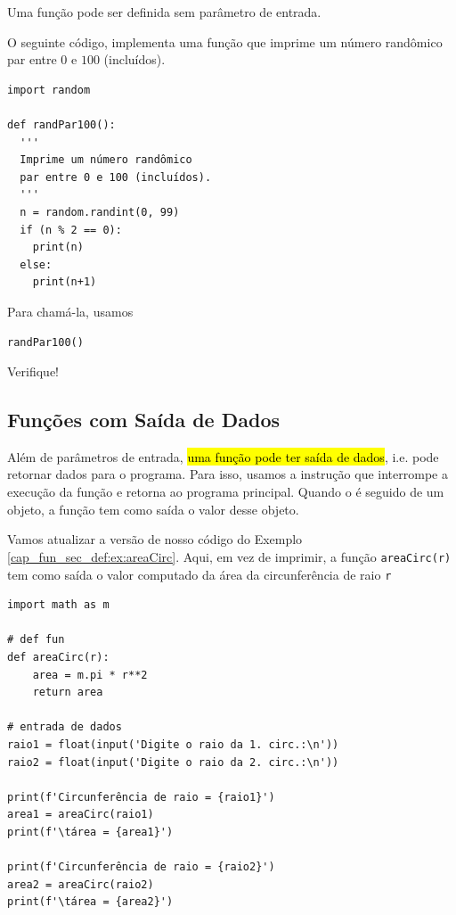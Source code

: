 Uma função pode ser definida sem parâmetro de entrada.

\begin{ex}
  O seguinte código, implementa uma função que imprime um número randômico par entre $0$ e $100$ (incluídos).

\begin{lstlisting}
import random

def randPar100():
  '''
  Imprime um número randômico
  par entre 0 e 100 (incluídos).
  '''
  n = random.randint(0, 99)
  if (n % 2 == 0):
    print(n)
  else:
    print(n+1)
\end{lstlisting}

Para chamá-la, usamos

\begin{lstlisting}
randPar100()
\end{lstlisting}

Verifique!
\end{ex}

\subsection{Funções com Saída de Dados}

Além de parâmetros de entrada, \hl{uma função pode ter saída de dados}, i.e. pode retornar dados para o programa. Para isso, usamos a instrução {\PYTHONreturn} que interrompe a execução da função e retorna ao programa principal. Quando o {\PYTHONreturn} é seguido de um objeto, a função tem como saída o valor desse objeto.

\begin{ex}
  Vamos atualizar a versão de nosso código do Exemplo \ref{cap_fun_sec_def:ex:areaCirc}. Aqui, em vez de imprimir, a função \lstinline+areaCirc(r)+ tem como saída o valor computado da área da circunferência de raio \lstinline+r+

\begin{lstlisting}
import math as m

# def fun
def areaCirc(r):
    area = m.pi * r**2
    return area
    
# entrada de dados
raio1 = float(input('Digite o raio da 1. circ.:\n'))
raio2 = float(input('Digite o raio da 2. circ.:\n'))

print(f'Circunferência de raio = {raio1}')
area1 = areaCirc(raio1)
print(f'\tárea = {area1}')

print(f'Circunferência de raio = {raio2}')
area2 = areaCirc(raio2)
print(f'\tárea = {area2}')
\end{lstlisting}

\end{ex}

